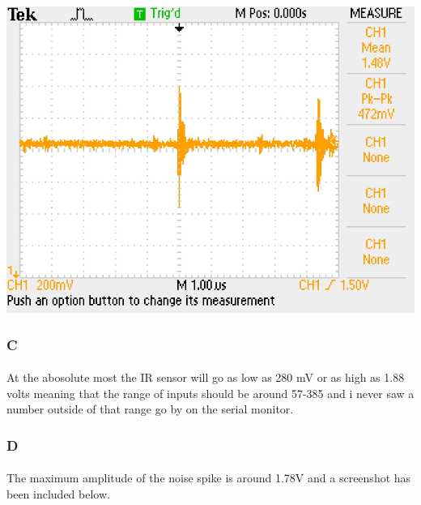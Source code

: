 \documentclass[12pt]{article}
\begin{document}
					\begin{center}
						\includegraphics[scale=0.5]{irnoise.jpg}\\
					\end{center}

			\subsubsection{C}
				\paragraph{}
					At the abosolute most the IR sensor will go as low as 280 mV or as high as 1.88 volts meaning that the range of inputs should be around 57-385
					and i never saw a number outside of that range go by on the serial monitor.

			\subsubsection{D}
				\paragraph{}
					The maximum amplitude of the noise spike is around 1.78V and a screenshot has been included below.
\end{document}
